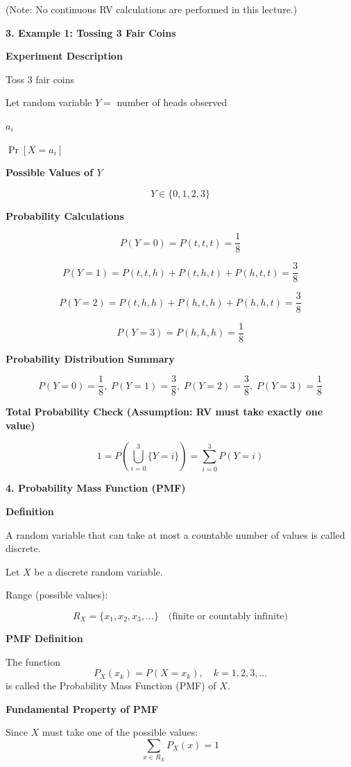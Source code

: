 \documentclass[12pt]{article}
\begin{document}
(Note: No continuous RV calculations are performed in this lecture.)

\vspace{0.5em}

\textbf{3. Example 1: Tossing 3 Fair Coins}

\textbf{Experiment Description}

Toss 3 fair coins

Let random variable $Y =$ number of heads observed

$a_i$

$\Pr[X = a_i]$

\textbf{Possible Values of $Y$}

\[
Y \in \{0,1,2,3\}
\]

\textbf{Probability Calculations}

\[
P(Y = 0) = P(t,t,t) = \frac{1}{8}
\]

\[
P(Y = 1) = P(t,t,h) + P(t,h,t) + P(h,t,t) = \frac{3}{8}
\]

\[
P(Y = 2) = P(t,h,h) + P(h,t,h) + P(h,h,t) = \frac{3}{8}
\]

\[
P(Y = 3) = P(h,h,h) = \frac{1}{8}
\]

\textbf{Probability Distribution Summary}

\[
P(Y=0)=\frac{1}{8},\;
P(Y=1)=\frac{3}{8},\;
P(Y=2)=\frac{3}{8},\;
P(Y=3)=\frac{1}{8}
\]

\textbf{Total Probability Check (Assumption: RV must take exactly one value)}

\[
1 = P\left(\bigcup_{i=0}^{3} \{Y=i\}\right)
  = \sum_{i=0}^{3} P(Y=i)
\]

\vspace{0.5em}

\textbf{4. Probability Mass Function (PMF)}

\textbf{Definition}

A random variable that can take at most a countable number of values is called discrete.

Let $X$ be a discrete random variable.

Range (possible values):

\[
R_X = \{x_1, x_2, x_3, \dots\} \quad \text{(finite or countably infinite)}
\]

\textbf{PMF Definition}

The function
\[
P_X(x_k) = P(X = x_k), \quad k = 1,2,3,\dots
\]
is called the Probability Mass Function (PMF) of $X$.

\textbf{Fundamental Property of PMF}

Since $X$ must take one of the possible values:
\[
\sum_{x \in R_X} P_X(x) = 1
\]
\end{document}
